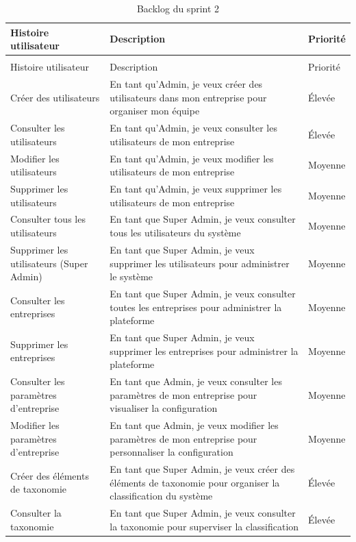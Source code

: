 \begin{longtable}{|>{\raggedright\arraybackslash}p{4cm}|>{\raggedright\arraybackslash}p{7cm}|>{\raggedright\arraybackslash}p{2cm}|}
\caption{Backlog du sprint 2}
\label{tab:sprint2_backlog}\\
\hline
Histoire utilisateur & Description & Priorité \\
\hline
\endfirsthead
\multicolumn{3}{c}{\tablename\ \thetable\ -- suite} \\
\hline
Histoire utilisateur & Description & Priorité \\
\hline
\endhead
Créer des utilisateurs & En tant qu'Admin, je veux créer des utilisateurs dans mon entreprise pour organiser mon équipe & Élevée \\
\hline
Consulter les utilisateurs & En tant qu'Admin, je veux consulter les utilisateurs de mon entreprise & Élevée \\
\hline
Modifier les utilisateurs & En tant qu'Admin, je veux modifier les utilisateurs de mon entreprise & Moyenne \\
\hline
Supprimer les utilisateurs & En tant qu'Admin, je veux supprimer les utilisateurs de mon entreprise & Moyenne \\
\hline
Consulter tous les utilisateurs & En tant que Super Admin, je veux consulter tous les utilisateurs du système & Moyenne \\
\hline
Supprimer les utilisateurs (Super Admin) & En tant que Super Admin, je veux supprimer les utilisateurs pour administrer le système & Moyenne \\
\hline
Consulter les entreprises & En tant que Super Admin, je veux consulter toutes les entreprises pour administrer la plateforme & Moyenne \\
\hline
Supprimer les entreprises & En tant que Super Admin, je veux supprimer les entreprises pour administrer la plateforme & Moyenne \\
\hline
Consulter les paramètres d'entreprise & En tant que Admin, je veux consulter les paramètres de mon entreprise pour visualiser la configuration & Moyenne \\
\hline
Modifier les paramètres d'entreprise & En tant que Admin, je veux modifier les paramètres de mon entreprise pour personnaliser la configuration & Moyenne \\
\hline
Créer des éléments de taxonomie & En tant que Super Admin, je veux créer des éléments de taxonomie pour organiser la classification du système & Élevée \\
\hline
Consulter la taxonomie & En tant que Super Admin, je veux consulter la taxonomie pour superviser la classification & Élevée \\

\end{longtable}
